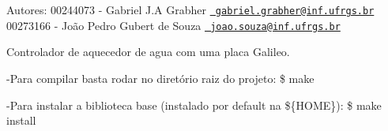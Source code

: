 Autores\+: 00244073 -\/ Gabriel J.\+A Grabher \href{mailto:gabriel.grabher@inf.ufrgs.br}{\texttt{ gabriel.\+grabher@inf.\+ufrgs.\+br}} 00273166 -\/ João Pedro Gubert de Souza \href{mailto:joao.souza@inf.ufrgs.br}{\texttt{ joao.\+souza@inf.\+ufrgs.\+br}}

Controlador de aquecedor de agua com uma placa Galileo.

-\/Para compilar basta rodar no diretório raiz do projeto\+: \$ make

-\/Para instalar a biblioteca base (instalado por default na \$\{HOME\})\+: \$ make install 